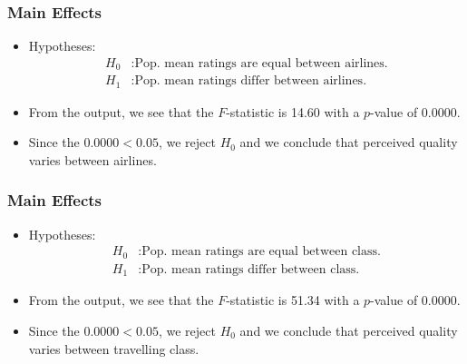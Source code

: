 \documentclass[12pt]{beamer}
\begin{document}
\begin{frame}
	\frametitle{Main Effects}
	
	\begin{itemize}[label={\color{blue}$\blacktriangleright$}]
		\item Hypotheses:
		\begin{align*}
			H_0 &: \text{Pop. mean ratings are equal between airlines.} \\
			H_1 &: \text{Pop. mean ratings differ between airlines.}
		\end{align*}
		
		\item From the output, we see that the $F$-statistic is 14.60 with a $p$-value of 0.0000.
		
		\item Since the $0.0000 < 0.05$, we reject $H_0$ and we conclude that perceived quality varies between airlines.
	\end{itemize}
	
\end{frame}
\begin{frame}
	\frametitle{Main Effects}
	
	\begin{itemize}[label={\color{blue}$\blacktriangleright$}]
		\item Hypotheses:
		\begin{align*}
			H_0 &: \text{Pop. mean ratings are equal between class.} \\
			H_1 &: \text{Pop. mean ratings differ between class.}
		\end{align*}
		
		\item From the output, we see that the $F$-statistic is 51.34 with a $p$-value of 0.0000.
		
		\item Since the $0.0000 < 0.05$, we reject $H_0$ and we conclude that perceived quality varies between travelling class.
	\end{itemize}
	
\end{frame}
\end{document}
